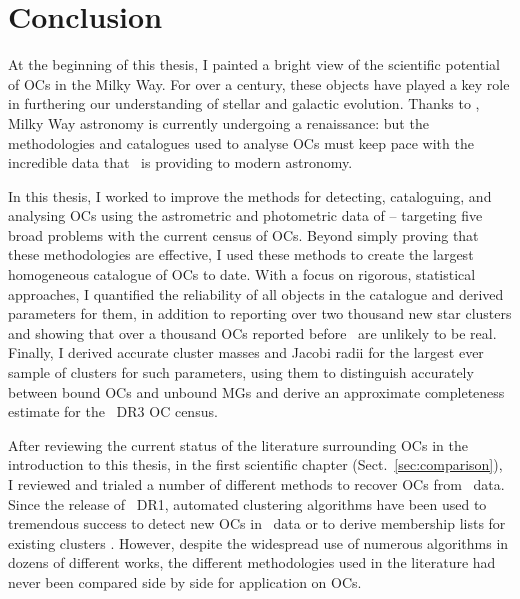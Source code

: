 %
\chapter{Conclusion}
\label{sec:conclusion}


At the beginning of this thesis, I painted a bright view of the scientific potential of OCs in the Milky Way. For over a century, these objects have played a key role in furthering our understanding of stellar and galactic evolution. Thanks to \gaia, Milky Way astronomy is currently undergoing a renaissance: but the methodologies and catalogues used to analyse OCs must keep pace with the incredible data that \gaia\ is providing to modern astronomy.

In this thesis, I worked to improve the methods for detecting, cataloguing, and analysing OCs using the astrometric and photometric data of \gaia -- targeting five broad problems with the current census of OCs. Beyond simply proving that these methodologies are effective, I used these methods to create the largest homogeneous catalogue of OCs to date. With a focus on rigorous, statistical approaches, I quantified the reliability of all objects in the catalogue and derived parameters for them, in addition to reporting over two thousand new star clusters and showing that over a thousand OCs reported before \gaia\ are unlikely to be real. Finally, I derived accurate cluster masses and Jacobi radii for the largest ever sample of clusters for such parameters, using them to distinguish accurately between bound OCs and unbound MGs and derive an approximate completeness estimate for the \gaia\ DR3 OC census.

After reviewing the current status of the literature surrounding OCs in the introduction to this thesis, in the first scientific chapter (Sect.~\ref{sec:comparison}), I reviewed and trialed a number of different methods to recover OCs from \gaia\ data. Since the release of \gaia\ DR1, automated clustering algorithms have been used to tremendous success to detect new OCs in \gaia\ data or to derive membership lists for existing clusters \citep[e.g.][]{castro-ginard_new_2018,castro-ginard_hunting_2019,castro-ginard_hunting_2020,castro-ginard_hunting_2022,liu_catalog_2019,cantat-gaudin_characterising_2018,cantat-gaudin_clusters_2020,cantat-gaudin_gaia_2019,he_catalogue_2021,he_new_2022,hao_sixteen_2020,jaehnig_membership_2021}. However, despite the widespread use of numerous algorithms in dozens of different works, the different methodologies used in the literature had never been compared side by side for application on OCs.


